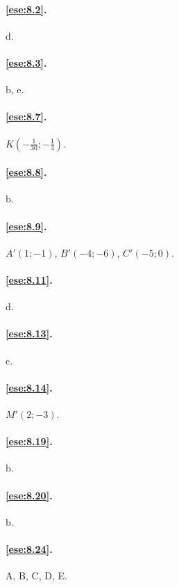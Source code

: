 \begingroup
\hypersetup{linkcolor=black}

\paragraph{\ref{ese:8.2}.}
d.

\paragraph{\ref{ese:8.3}.}
b, e.

\paragraph{\ref{ese:8.7}.}
$K\left(-\frac{1}{30};-\frac{1}{4}\right)$.

\paragraph{\ref{ese:8.8}.}
b.

\paragraph{\ref{ese:8.9}.}
$A'(1;-1)$, $B'(-4;-6)$, $C'(-5;0)$.

\paragraph{\ref{ese:8.11}.}
d.

\paragraph{\ref{ese:8.13}.}
c.

\paragraph{\ref{ese:8.14}.}
$M'(2;-3)$.

\paragraph{\ref{ese:8.19}.}
b.

\paragraph{\ref{ese:8.20}.}
b.

\paragraph{\ref{ese:8.24}.}
A, B, C, D, E.

